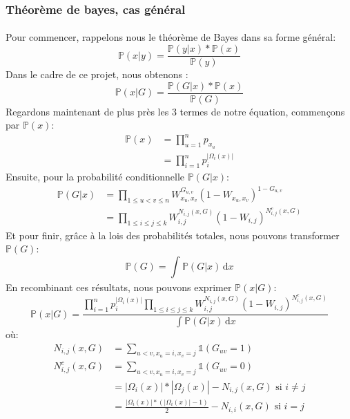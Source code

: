 \subsubsection{Théorème de bayes, cas général}
\paragraph{}
Pour commencer, rappelons nous le théorème de Bayes dans sa forme général:
\begin{equation*}
    \mathbb{P}(x|y) = \frac{\mathbb{P}(y|x)*\mathbb{P}(x)}{\mathbb{P}(y)}
\end{equation*}
Dans le cadre de ce projet, nous obtenons :
\begin{equation*}
    \mathbb{P}(x|G) = \frac{\mathbb{P}(G|x)*\mathbb{P}(x)}{\mathbb{P}(G)}
\end{equation*}
Regardons maintenant de plus près les 3 termes de notre équation, commençons par $\mathbb{P}(x)$:
\begin{align*}
    \mathbb{P}(x) &= \prod_{u=1}^n p_{x_u} \\ 
                  &= \prod_{i=1}^n p_i^{|\Omega_i(x)|}
\end{align*}
Ensuite, pour la probabilité conditionnelle $\mathbb{P}(G|x)$:
\begin{align*}
    \mathbb{P}(G|x) &= \prod_{1 \leq u < v \leq n} W_{x_u,x_v}^{G_{u,v}} (1-W_{x_u,x_v})^{1-G_{u,v}}\\ 
                    &= \prod_{1 \leq i \leq j \leq k} W_{i,j}^{N_{i,j}(x,G)} (1-W_{i,j})^{N_{i,j}^c(x,G)}
\end{align*}
Et pour finir, grâce à la lois des probabilités totales, nous pouvons transformer $\mathbb{P}(G)$: 
\begin{equation*}
    \mathbb{P}(G) = \int_{}^{} \mathbb{P}(G|x) \, \mathrm{d}x
\end{equation*}
En recombinant ces résultats, nous pouvons exprimer $\mathbb{P}(x|G)$:
\begin{equation*}
    \mathbb{P}(x|G) = \frac{\prod_{i=1}^n p_i^{|\Omega_i(x)|} \prod_{1 \leq i \leq j \leq k} W_{i,j}^{N_{i,j}(x,G)} (1-W_{i,j})^{N_{i,j}^c(x,G)}}{ \int\mathbb{P}(G|x) \, \mathrm{d}x}
\end{equation*}
où:
\begin{align*}
    N_{i,j}(x,G)&=\sum_{u<v,x_u=i,x_v=j} \mathbb{1} (G_{uv}=1) \\
    N_{i,j}^c(x,G) &= \sum_{u<v,x_u=i,x_v=j} \mathbb{1} (G_{uv}=0)\\
                   &= |\Omega_i(x)|*|\Omega_j(x)| - N_{i,j}(x,G) \text{  si }i \ne j\\
                   &= \frac{|\Omega_i(x)|*(|\Omega_i(x)|-1)}{2} - N_{i,i}(x,G) \text{  si }i = j
\end{align*}

